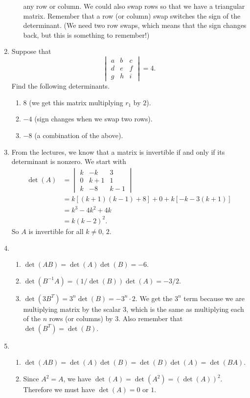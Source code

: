 \documentclass[english,12pt,a4paper]{scrartcl}
\begin{document}
\begin{enumerate}
\begin{enumerate}
        any row or column. We could also swap rows so that we have a triangular 
        matrix. Remember that a row (or column) swap switches the sign of the 
        determinant. (We need two row swaps, which means that the sign changes 
        back, but this is something to remember!)
    \end{enumerate}
  \item %
    Suppose that
    \[
      \begin{vmatrix}
        a & b & c \\
        d & e & f \\
        g & h & i
      \end{vmatrix}
       = 4.
    \]
    Find the following determinants.
    \begin{enumerate}
      \item $8$ (we get this matrix multiplying $r_1$ by $2$).
      \item $-4$ (sign changes when we swap two rows).
      \item $-8$ (a combination of the above).
    \end{enumerate}
  \item %
    From the lectures, we know that a matrix is invertible if and only if its 
    determinant is nonzero. We start with
    \begin{align*}
      \det(A) &=
      \begin{vmatrix}
        k & -k & 3 \\
        0 & k + 1 & 1 \\
        k & -8 & k - 1
      \end{vmatrix} \\
      &= k[(k + 1)(k - 1) + 8] + 0 + k[-k - 3(k + 1)] \\
      &= k^3 - 4k^2 + 4k \\
      &= k(k - 2)^2.
    \end{align*}
    So $A$ is invertible for all $k \ne 0$, $2$.
  \item %
    \begin{enumerate}
      \item $\det(AB) = \det(A)\det(B) = -6$.
      \item $\det(B^{-1}A) = (1 / \det(B)) \det(A) = -3 / 2$.
      \item $\det(3B^T) = 3^n \det(B) = -3^n \cdot 2$. We get the $3^n$ term 
        because we are multiplying matrix by the scalar $3$, which is the same 
        as multiplying each of the $n$ rows (or columns) by $3$. Also remember 
        that $\det(B^T) = \det(B)$.
    \end{enumerate}
  \item %
    \begin{enumerate}
      \item $\det(AB) = \det(A)\det(B) = \det(B)\det(A) = \det(BA)$.
      \item Since $A^2 = A$, we have $\det(A) = \det(A^2) = (\det(A))^2$.  
        Therefore we must have $\det(A) = 0$ or $1$.
    \end{enumerate}
\end{enumerate}
\end{document}
